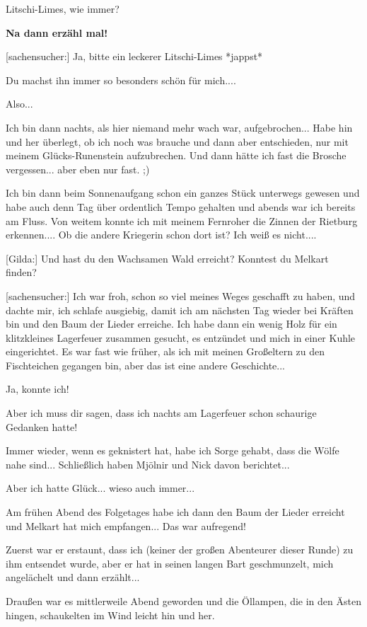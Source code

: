 \documentclass[10pt, a4paper, oneside]{book}
\begin{document}
\begin{multicols}{2}
Litschi-Limes, wie immer?

\textbf{Na dann erzähl mal!}

[sachensucher:] Ja, bitte ein leckerer Litschi-Limes *jappst*

Du machst ihn immer so besonders schön für mich....

Also...

Ich bin dann nachts, als hier niemand mehr wach war, aufgebrochen... Habe hin und her überlegt, ob ich noch was brauche und dann aber entschieden, nur mit meinem Glücks-Runenstein aufzubrechen. Und dann hätte ich fast die Brosche vergessen... aber eben nur fast. ;)

Ich bin dann beim Sonnenaufgang schon ein ganzes Stück unterwegs gewesen und habe auch denn Tag über ordentlich Tempo gehalten und abends war ich bereits am Fluss. Von weitem konnte ich mit meinem Fernroher die Zinnen der Rietburg erkennen.... Ob die andere Kriegerin schon dort ist? Ich weiß es nicht....

[Gilda:] Und hast du den Wachsamen Wald erreicht? Konntest du Melkart finden?

[sachensucher:] Ich war froh, schon so viel meines Weges geschafft zu haben, und dachte mir, ich schlafe ausgiebig, damit ich am nächsten Tag wieder bei Kräften bin und den Baum der Lieder erreiche. Ich habe dann ein wenig Holz für ein klitzkleines Lagerfeuer zusammen gesucht, es entzündet und mich in einer Kuhle eingerichtet. Es war fast wie früher, als ich mit meinen Großeltern zu den Fischteichen gegangen bin, aber das ist eine andere Geschichte...

Ja, konnte ich!

Aber ich muss dir sagen, dass ich nachts am Lagerfeuer schon schaurige Gedanken hatte!

Immer wieder, wenn es geknistert hat, habe ich Sorge gehabt, dass die Wölfe nahe sind... Schließlich haben Mjölnir und Nick davon berichtet...

Aber ich hatte Glück... wieso auch immer...

Am frühen Abend des Folgetages habe ich dann den Baum der Lieder erreicht und Melkart hat mich empfangen... Das war aufregend!

Zuerst war er erstaunt, dass ich (keiner der großen Abenteurer dieser Runde) zu ihm entsendet wurde, aber er hat in seinen langen Bart geschmunzelt, mich angelächelt und dann erzählt...

Draußen war es mittlerweile Abend geworden und die Öllampen, die in den Ästen hingen, schaukelten im Wind leicht hin und her.


\end{multicols}
\end{document}
